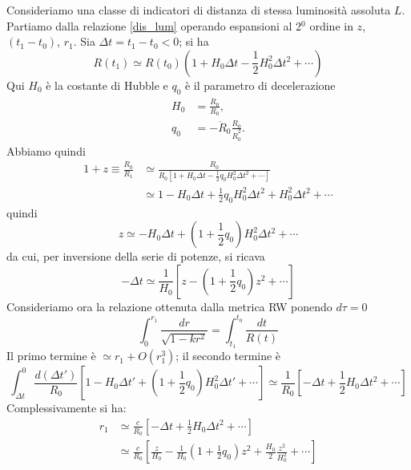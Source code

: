 Consideriamo una classe di indicatori di distanza di stessa luminosità assoluta
$L$. Partiamo dalla relazione \eqref{dis_lum} operando espansioni al 2$^0$
ordine in $z$, $(t_1-t_0)$, $r_1$.  Sia $\Delta t= t_1-t_0 <0$; si ha
\begin{equation}
  R(t_1) \simeq R(t_0) \left( 1+H_0 \Delta t -\frac{1}{2} H^2_0 \Delta
    t^2+\cdots \right)
\end{equation}
Qui $H_0$ è la costante di Hubble e $q_0$ è il parametro di decelerazione
\begin{subequations}
  \begin{align}
    H_0 &= \frac{{\dot R}_0 }{R_0}, \\
    q_0 &= - {\ddot R}_0 \frac{R_0}{{\dot R}^2_0}.
  \end{align}
\end{subequations}
Abbiamo quindi
\begin{equation}
  \begin{split}
    1+z \equiv \frac{R_0}{R_1} & \simeq \frac{R_0}{R_0 \left[ 1+H_0 \Delta t -
        \frac{1}{2} q_0 H^2_0 \Delta t^2+\cdots\right]} \\
    & \simeq  1- H_0 \Delta t +\frac{1}{2} q_0 H^2_0 \Delta t^2 + H^2_0 \Delta
    t^2+\cdots
  \end{split}
\end{equation}
quindi
\begin{equation}
  z \simeq - H_0 \Delta t +\left( 1+\frac{1}{2} q_0 \right) H^2_0 \Delta t^2
  +\cdots
\end{equation}
da cui, per inversione della serie di potenze, si ricava
\begin{equation}
  -\Delta t \simeq  \frac{1}{H_0} \left[ z - \left( 1 +\frac{1}{2} q_0 \right)
    z^2 +\cdots \right]
\end{equation}
Consideriamo ora la relazione ottenuta dalla metrica RW ponendo $d\tau=0$
\begin{equation}
  \int_0^{r_1} \frac{dr}{\sqrt{1-kr^2}} = \int_{t_1}^{t_0} \frac{dt}{R(t)}
\end{equation}
Il primo termine è $ \simeq r_1 + O(r^3_1)$; il secondo termine è
\begin{equation}
  \int_{\Delta t}^{0} \frac{d(\Delta t')}{R_0} \left[ 1-H_0 \Delta t' + \left(1+
      \frac{1}{2} q_0 \right) H^2_0
    \Delta t' +\cdots \right] \simeq \frac{1}{R_0} \left[ -\Delta t +
    \frac{1}{2} H_0 \Delta t^2+\cdots \right]
\end{equation}
Complessivamente si ha:
\begin{equation}
  \begin{split}
    r_1 & \simeq \frac{c}{R_0} \left[ -\Delta t + \frac{1}{2}H_0 \Delta t^2 + \cdots \right] \\
    & \simeq \frac{c}{R_0} \left[
      \frac{z}{H_0} -
      \frac{1}{H_0} \left(1 + \frac{1}{2} q_0 \right) z^2
      + \frac{H_0}{2} \frac{z^2}{H^2_0} + \cdots \right]
  \end{split}
\end{equation}
